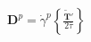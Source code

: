 \documentclass[preview]{standalone}
\begin{document}
\begin{align*}
\mathbf{D}^p = \dot{\gamma}^p \left\{ \frac{\tilde{\mathbf{T}}'}{2 \bar{\tau}} \right\}
\end{align*}
\end{document}
